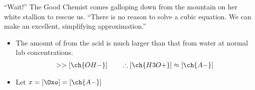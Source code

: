 \documentclass[notes=hide]{beamer}
\begin{document}
\begin{frame}[t]{``Wait!''}
	The Good Chemist comes galloping down from the mountain on her white
	stallion to rescue us. ``There is no reason to solve a cubic equation.
	We can make an excellent, simplifying approximation.''

	\begin{itemize}
		\item The amount of  from the acid is much larger than
			that from water at \alert{normal lab concentrations}.
			\begin{align*}
				[\ch{A-}] >> [\ch{OH-}] \qquad\therefore [\ch{H3O+}]
				\approx [\ch{A-}]
			\end{align*}
		\item Let $x = [\Oxo] = [\ch{A-}]$
	\end{itemize}

	\clearpage


\end{frame}
\end{document}

